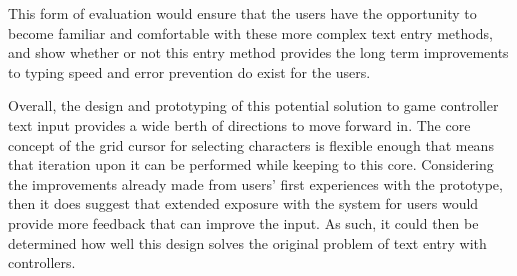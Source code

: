 \documentclass[future.tex]{subfiles}
\begin{document}
This form of evaluation would ensure that the users have the opportunity to
become familiar and comfortable with these more complex text entry methods, and
show whether or not this entry method provides the long term improvements to
typing speed and error prevention do exist for the users.

Overall, the design and prototyping of this potential solution to game
controller text input provides a wide berth of directions to move forward in.
The core concept of the grid cursor for selecting characters is flexible enough
that means that iteration upon it can be performed while keeping to this core.
Considering the improvements already made from users' first experiences with the
prototype, then it does suggest that extended exposure with the system for users
would provide more feedback that can improve the input. As such, it could then
be determined how well this design solves the original problem of text entry
with controllers.
\end{document}
